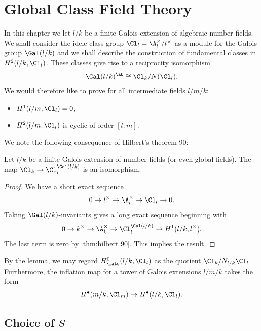\chapter{Global Class Field Theory}

In this chapter we let $l/k$ be a finite Galois extension of
algebraic number fields. We shall consider the idele class group $\Cl_l = \A_l^\times / l^\times$
as a module for the Galois group $\Gal(l/k)$ and we shall describe the construction of
fundamental classes in $H^2(l/k, \Cl_l)$.
These classes give rise to a reciprocity isomorphism
\[
	\Gal(l/k)^{\ab} \cong \Cl_k / N(\Cl_l).
\]
We would therefore like to prove for all intermediate fields $l / m / k$:
\begin{itemize}
	\item
	$H^1(l/m, \Cl_l) = 0$,
	\item
	$H^2(l/m, \Cl_l)$ is cyclic of order $[l:m]$.
\end{itemize}

We note the following consequence of Hilbert's theorem 90:

\begin{lemma} \label{lem:idele class invariants}
	Let $l/k$ be a finite Galois extension of number fields (or even global fields).
	The map $\Cl_k \to \Cl_l ^ {\Gal(l/k)}$ is an isomorphism.
\end{lemma}

\begin{proof}
	We have a short exact sequence
	\[
		0 \to l^\times \to \A_l^\times \to \Cl_l \to 0.
	\]
	Taking $\Gal(l/k)$-invariants gives a long exact sequence beginning with
	\[
		0 \to k^\times \to \A_k^\times \to \Cl_l^{\Gal(l/k)} \to H^1(l/k, l^\times).
	\]
	The last term is zero by \ref{thm:hilbert 90}. This implies the result.
\end{proof}

By the lemma, we may regard $H^0_{\Tate}(l/k,\Cl_l)$ as the quotient
$\Cl_k / N_{l/k} \Cl_l$.
Furthermore, the inflation map for a tower of Galois extensions $l/m/k$ takes the form
\[
	H^\bullet(m/k, \Cl_m) \to H^\bullet(l/k, \Cl_l).
\]







\section{Choice of \texorpdfstring{$S$}{S}}

